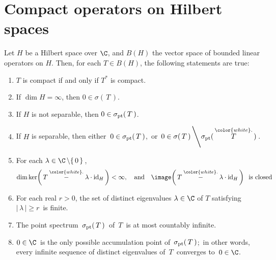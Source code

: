 

\section{Compact operators on Hilbert spaces}
\setcounter{theorem}{0}
\setcounter{equation}{0}


\renewcommand{\theenumi}{\roman{enumi}}
\renewcommand{\labelenumi}{\textnormal{(\theenumi)}$\;\;$}


\begin{theorem}\mbox{}
\vskip 0.1cm
\noindent
Let $H$ be a Hilbert space over $\C$, and $B(H)$ the vector space of bounded linear operators on $H$.
Then, for each $T \in B(H)$, the following statements are true:
\begin{enumerate}
\item
	$T$ is compact if and only if $T^{*}$ is compact.
\item
	If $\dim H = \infty$, then $0 \in \sigma(\,T\,)$.
\item
	If $H$ is not separable, then $0 \in \sigma_{\textnormal{pt}}(\,T\,)$.
\item
	If $H$ is separable, then either \,$0 \in \sigma_{\textnormal{pt}}(\,T\,)$,\, or
	\,$0 \in \sigma(\,T\,) \left\backslash \sigma_{\textnormal{pt}}(\,\overset{{\color{white}.}}{T}\,)\right.$.
\item
	For each $\lambda \in \C \left\backslash\{\,0\,\}\right.$,
	\begin{equation*}
	\dim\ker\!\left(\,T \overset{{\color{white}.}}{-} \lambda\cdot\textnormal{id}_{H}\,\right) < \infty,
	\quad\textnormal{and}\quad
	\image\!\left(\,T \overset{{\color{white}.}}{-} \lambda\cdot\textnormal{id}_{H}\,\right)\;\;\textnormal{is closed}
	\end{equation*}
\item
	For each real $r > 0$, the set of distinct eigenvalues $\lambda \in \C$ of $T$
	satisfying \,$\vert\,\lambda\,\vert \geq r$\, is finite.
\item
	The point spectrum \,$\sigma_{\textnormal{pt}}(\,T\,)$\, of $\,T$\, is at most countably infinite.
\item
	$0 \in \C$\, is the only possible accumulation point of \,$\sigma_{\textnormal{pt}}(\,T\,)$;\,
	in other words, every infinite sequence of distinct eigenvalues of \,$T$\, converges to \,$0 \in \C$.

\end{enumerate}
\end{theorem}
